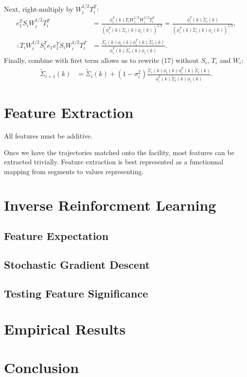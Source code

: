 \documentclass{article}
\begin{document}
Next, right-multiply by $W_i^{1/2} T_i^T$:
$$
\begin{align}
  e_1^T S_i W_i^{1/2} T_i^T & =
    \frac{\phi_i^T(k) T_i W_i^{1/2} W_i^{1/2} T_i^T}
    {(\phi_i^T(k) \tilde{\Sigma}_i(k) \phi_i(k))^{1/2}}
  = \frac{\phi_i^T(k) \tilde{\Sigma}_i(k)}
    {(\phi_i^T(k) \tilde{\Sigma}_i(k) \phi_i(k))^{1/2}}, \\
  \therefore T_i W_i^{1/2} S_i^T e_1 e_1^T S_i W_i^{1/2} T_i^T & =
    \frac{\tilde{\Sigma}_i(k) \phi_i(k) \phi_i^T(k) \tilde{\Sigma}_i(k)}
    {\phi_i^T(k) \tilde{\Sigma}_i(k) \phi_i(k)}.
\end{align}
$$
Finally, combine with first term allows us to rewrite (17) without $S_i$, $T_i$ and $W_i$:
$$
\begin{align}
\tilde{\Sigma}_{i+1}(k) &  =
  \tilde{\Sigma}_i(k) + (1 - \sigma_i^2)
    \frac{\tilde{\Sigma}_i(k) \phi_i(k) \phi_i^T(k) \tilde{\Sigma}_i(k)}
    {\phi_i^T(k) \tilde{\Sigma}_i(k) \phi_i(k)}.
\end{align}
$$
\fi

\section{Feature Extraction}\label{Sec:Features}

All features must be additive.

Once we have the trajectories matched onto the facility, most features can be extracted trivially. 
Feature extraction is best represented as a functionnal 
mapping from segments to values representing.

\section{Inverse Reinforcment Learning}\label{Sec:IRL}

\subsection{Feature Expectation}\label{Sec:Features}

\subsection{Stochastic Gradient Descent}\label{Sec:SGD}

\subsection{Testing Feature Significance}\label{Sec:Significance}

\section{Empirical Results}\label{Sec:Result}

\section{Conclusion}\label{Sec:Conclu}

{}

\end{document}
